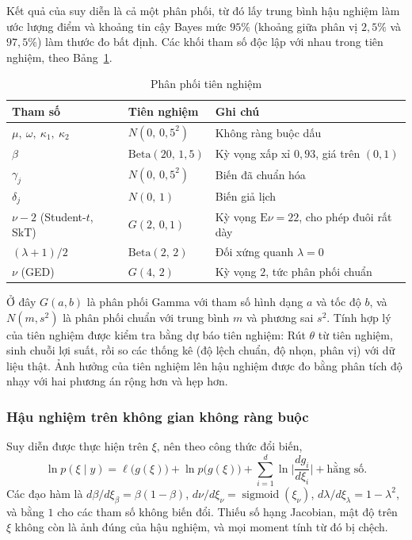 \documentclass[12pt,a4paper]{article}
\theoremstyle{definition}
\theoremstyle{remark}
\newcommand{\E}{\mathrm{E}}
\newcommand{\Ncal}{N}
\newcommand{\sigm}{\operatorname{sigmoid}}
\begin{document}
Kết quả của suy diễn là cả một phân phối, từ đó lấy trung bình hậu nghiệm làm ước lượng điểm và khoảng tin cậy Bayes mức $95\%$ (khoảng giữa phân vị $2{,}5\%$ và $97{,}5\%$) làm thước đo bất định. Các khối tham số độc lập với nhau trong tiên nghiệm, theo Bảng~\ref{tab:prior}.

\begin{table}[h]
\centering
\caption{Phân phối tiên nghiệm}\label{tab:prior}
\begin{tabular}{@{}lll@{}}
\toprule
\textbf{Tham số} & \textbf{Tiên nghiệm} & \textbf{Ghi chú} \\
\midrule
$\mu,\ \omega,\ \kappa_1,\ \kappa_2$ & $\Ncal(0,\,0{,}5^2)$ & Không ràng buộc dấu \\
$\beta$ & $\mathrm{Beta}(20,\,1{,}5)$ & Kỳ vọng xấp xỉ $0{,}93$, giá trên $(0,1)$ \\
$\gamma_j$ & $\Ncal(0,\,0{,}5^2)$ & Biến đã chuẩn hóa \\
$\delta_j$ & $\Ncal(0,\,1)$ & Biến giả lịch \\
$\nu-2$ (Student-$t$, SkT) & $G(2,\,0{,}1)$ & Kỳ vọng $\E\nu=22$, cho phép đuôi rất dày \\
$(\lambda+1)/2$ & $\mathrm{Beta}(2,\,2)$ & Đối xứng quanh $\lambda=0$ \\
$\nu$ (GED) & $G(4,\,2)$ & Kỳ vọng $2$, tức phân phối chuẩn \\
\bottomrule
\end{tabular}
\end{table}

Ở đây $G(a,b)$ là phân phối Gamma với tham số hình dạng $a$ và tốc độ $b$, và $N(m,s^2)$ là phân phối chuẩn với trung bình $m$ và phương sai $s^2$. Tính hợp lý của tiên nghiệm được kiểm tra bằng dự báo tiên nghiệm: Rút $\theta$ từ tiên nghiệm, sinh chuỗi lợi suất, rồi so các thống kê (độ lệch chuẩn, độ nhọn, phân vị) với dữ liệu thật. Ảnh hưởng của tiên nghiệm lên hậu nghiệm được đo bằng phân tích độ nhạy với hai phương án rộng hơn và hẹp hơn.

\subsubsection{Hậu nghiệm trên không gian không ràng buộc}

Suy diễn được thực hiện trên $\xi$, nên theo công thức đổi biến,
\begin{equation}\label{eq:posterior}
\ln p(\xi\mid y)=\ell\big(g(\xi)\big)+\ln p\big(g(\xi)\big)+\sum_{i=1}^{d}\ln\Big|\frac{d g_i}{d\xi_i}\Big|+\text{hằng số}.
\end{equation}
Các đạo hàm là $d\beta/d\xi_\beta=\beta(1-\beta)$, $d\nu/d\xi_\nu=\sigm(\xi_\nu)$, $d\lambda/d\xi_\lambda=1-\lambda^2$, và bằng $1$ cho các tham số không biến đổi. Thiếu số hạng Jacobian, mật độ trên $\xi$ không còn là ảnh đúng của hậu nghiệm, và mọi moment tính từ đó bị chệch.
\end{document}
